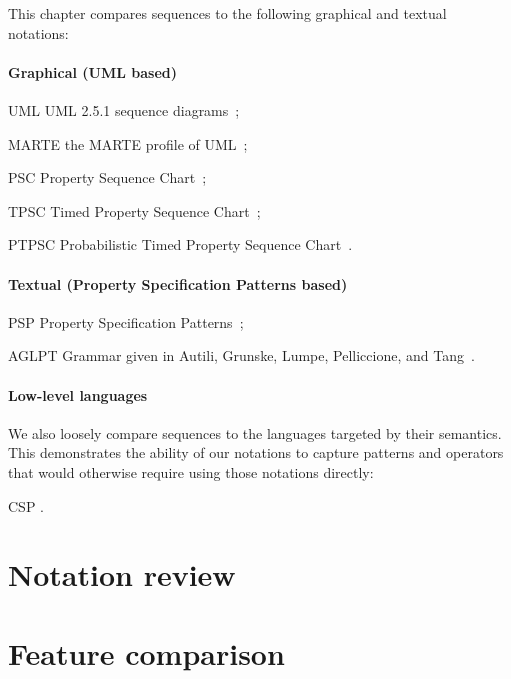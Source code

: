 
This chapter compares \langname{} sequences to the following graphical
and textual notations:


\paragraph{Graphical (UML based)}

\begin{featset}
\item[UML] UML 2.5.1 sequence diagrams~\cite{uml251};
\item[MARTE] the MARTE profile of UML~\cite{marte12};
\item[PSC] Property Sequence Chart~\cite{psc};
\item[TPSC] Timed Property Sequence Chart~\cite{tpsc};
\item[PTPSC] Probabilistic Timed Property Sequence Chart~\cite{ptpsc}.
\end{featset}

\paragraph{Textual (Property Specification Patterns based)}

\begin{featset}
\item[PSP] Property Specification Patterns~\cite{psp,pspsite};
\item[AGLPT] Grammar given in Autili, Grunske, Lumpe, Pelliccione, and Tang~\cite{aglpt}.
\end{featset}

\paragraph{Low-level languages}
We also loosely compare \langname{} sequences to the languages targeted by their
semantics.
This demonstrates the ability of our notations to
capture patterns and operators that would otherwise require using
those notations directly:

\begin{featset}
\item[CSP] \tockcsp.
\end{featset}

\section{Notation review}\label{sec:seq-comparison-review}


\section{Feature comparison}\label{sec:seq-comparison-features}


